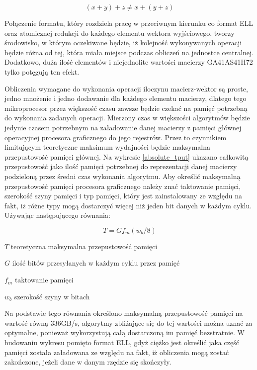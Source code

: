 \begin{equation}
    (x+y)+z \neq x+(y+z)
\end{equation}

Połączenie formatu, który rozdziela pracę w przeciwnym kierunku co format ELL oraz atomicznej redukcji do każdego elementu wektora wyjściowego, tworzy środowisko, w którym oczekiwane będzie, iż kolejność wykonywanych operacji będzie różna od tej, która miała miejsce podczas obliczeń na jednostce centralnej.
Dodatkowo, duża ilość elementów i niejednolite wartości macierzy GA41AS41H72 tylko potęgują ten efekt.

Obliczenia wymagane do wykonania operacji iloczynu macierz-wektor są proste, jedno mnożenie i jedno dodawanie dla każdego elementu macierzy, dlatego tego mikroprocesor przez większość czasu zawsze będzie czekać na pamięć potrzebną do wykonania zadanych operacji.
Mierzony czas w większości algorytmów będzie jedynie czasem potrzebnym na załadowanie danej macierzy z pamięci głównej operacyjnej procesora graficznego do jego rejestrów.
Przez to czynnikiem limitującym teoretyczne maksimum wydajności będzie maksymalna przepustowość pamięci głównej.
Na wykresie \ref{absolute_tput} ukazano całkowitą przepustowość jako ilość pamięci potrzebnej do reprezentacji danej macierzy podzieloną przez średni czas wykonania algorytmu.
Aby określić maksymalną przepustowość pamięci procesora graficznego należy znać taktowanie pamięci, szerokość szyny pamięci i typ pamięci, który jest zainstalowany ze względu na fakt, iż różne typy mogą dostarczyć więcej niż jeden bit danych w każdym cyklu.
Używając następującego równania:

\begin{equation}
    T = G f_m (w_b / 8)
\end{equation}

\begin{eqwhere}[2cm]
	\item[$T$] teoretyczna maksymalna przepustowość pamięci
    \item[$G$] ilość bitów przesyłanych w każdym cyklu przez pamięć 
	\item[$f_m$] taktowanie pamięci
    \item[$w_b$] szerokość szyny w bitach
\end{eqwhere}

Na podstawie tego równania określono maksymalną przepustowość pamięci na wartość równą 336GB/s, algorytmy zbliżające się do tej wartości można uznać za optymalne, ponieważ wykorzystują całą dostarczoną im pamięć bezstratnie.
W budowaniu wykresu pomięto format ELL, gdyż ciężko jest określić jaka część pamięci została załadowana ze względu na fakt, iż obliczenia mogą zostać zakończone, jeżeli dane w danym rzędzie się skończyły.


